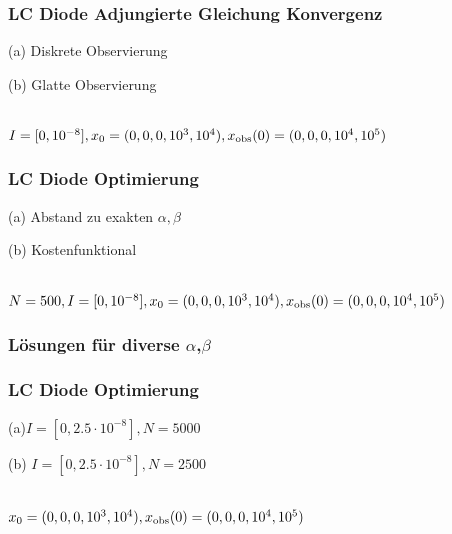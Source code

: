 \begin{frame}[<+->]
\frametitle{LC Diode Adjungierte Gleichung Konvergenz}
\begin{minipage}{0.45\linewidth}
\centering
 
 (a) Diskrete Observierung
\end{minipage}
\begin{minipage}{0.45\linewidth}
\centering
 
(b) Glatte Observierung
 \end{minipage}
 \centering
 \\[0.3cm]
  $I=[0,10^{-8}],x_0=(0,0,0,10^3,10^{4}),x_\text{obs}(0)=(0,0,0,10^4,10^5)$
\end{frame}


\begin{frame}[<+->]
\frametitle{LC Diode Optimierung}
\begin{minipage}{0.45\linewidth}
\centering
 
(a) Abstand zu exakten $\alpha,\beta$
\end{minipage}
\begin{minipage}{0.45\linewidth}
\centering
 
(b) Kostenfunktional
\end{minipage}
 \centering
 \\[0.3cm]
  $N=500,I=[0,10^{-8}],x_0=(0,0,0,10^3,10^{4}),x_\text{obs}(0)=(0,0,0,10^4,10^5)$
\end{frame}


\begin{frame}[<+->]
\frametitle{Lösungen für diverse $\alpha$,$\beta$}
\begin{minipage}{0.45\linewidth}
\centering
 
\end{minipage}
\begin{minipage}{0.45\linewidth}
\centering
 
\end{minipage}
\end{frame}

\begin{frame}[<+->]
\frametitle{LC Diode Optimierung}
\begin{minipage}{0.45\linewidth}
\centering
 
(a)$I=[0,2.5\cdot10^{-8}],N=5000$ 
\end{minipage}
\begin{minipage}{0.45\linewidth}
\centering
 
(b) $I=[0,2.5\cdot10^{-8}],N=2500$ 
\end{minipage}
 \centering
 \\[0.3cm]
  $x_0=(0,0,0,10^3,10^{4}),x_\text{obs}(0)=(0,0,0,10^4,10^5)$
\end{frame}




